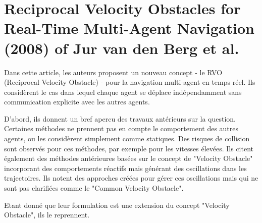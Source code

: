 \documentclass[11pt]{article}
\begin{document}
\section{Reciprocal Velocity Obstacles for Real-Time Multi-Agent Navigation (2008) of Jur van den Berg et al.}

Dans cette article, les auteurs proposent un nouveau concept - le RVO (Reciprocal Velocity Obstacle) - pour la navigation multi-agent en temps réel. Ils considèrent le cas dans lequel chaque agent se déplace indépendamment sans communication explicite avec les autres agents. 

D'abord, ils donnent un bref apercu des travaux antérieurs sur la question. Certaines méthodes ne prennent pas en compte le comportement des autres agents, ou les considèrent simplement comme statiques. Des risques de collision sont observés pour ces méthodes, par exemple pour les vitesses élevées. Ils citent également des méthodes antérieures basées sur le concept de "Velocity Obstacle" incorporant des comportements réactifs mais générant des oscillations dans les trajectoires. Ils notent des approches créées pour gérer ces oscillations mais qui ne sont pas clarifiées comme le "Common Velocity Obstacle".

Etant donné que leur formulation est une extension du concept "Velocity Obstacle", ils le reprennent. 
\end{document}
